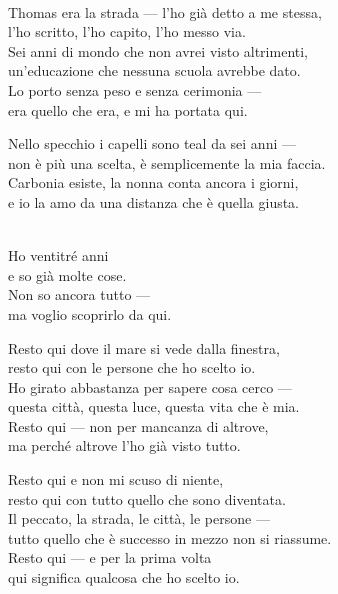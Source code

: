 \begin{lyrics}
\\
Thomas era la strada — l'ho già detto a me stessa,\\
l'ho scritto, l'ho capito, l'ho messo via.\\
Sei anni di mondo che non avrei visto altrimenti,\\
un'educazione che nessuna scuola avrebbe dato.\\
Lo porto senza peso e senza cerimonia —\\
era quello che era, e mi ha portata qui.

Nello specchio i capelli sono teal da sei anni —\\
non è più una scelta, è semplicemente la mia faccia.\\
Carbonia esiste, la nonna conta ancora i giorni,\\
e io la amo da una distanza che è quella giusta.

\\
Ho ventitré anni\\
e so già molte cose.\\
Non so ancora tutto —\\
ma voglio scoprirlo da qui.

Resto qui dove il mare si vede dalla finestra,\\
resto qui con le persone che ho scelto io.\\
Ho girato abbastanza per sapere cosa cerco —\\
questa città, questa luce, questa vita che è mia.\\
Resto qui — non per mancanza di altrove,\\
ma perché altrove l'ho già visto tutto.

Resto qui e non mi scuso di niente,\\
resto qui con tutto quello che sono diventata.\\
Il peccato, la strada, le città, le persone —\\
tutto quello che è successo in mezzo non si riassume.
\\
Resto qui — e per la prima volta\\
qui significa qualcosa che ho scelto io.

\end{lyrics}

